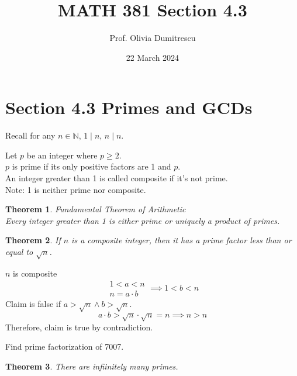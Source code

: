 \documentclass[letterpaper, 12pt]{article}
\title{MATH 381 Section 4.3}
\author{Prof. Olivia Dumitrescu}
\date{22 March 2024}
\newtheorem{theorem}{Theorem}[section]
\newenvironment{proof}[1][Proof]{\begin{trivlist}
\item[\hskip \labelsep {\bfseries #1}]}{\end{trivlist}}
\newenvironment{definition}[1][Definition]{\begin{trivlist}
\item[\hskip \labelsep {\bfseries #1}]}{\end{trivlist}}
\newenvironment{example}[1][Example]{\begin{trivlist}
\item[\hskip \labelsep {\bfseries #1}]}{\end{trivlist}}
\newcommand{\N}{\mathbb{N}}
\newcommand{\0}{\emptyset}
\begin{document}
    \maketitle
    \section*{Section 4.3 Primes and GCDs}
    Recall for any $n \in \N$, $1 \mid n$, $n \mid n$.
    \begin{definition}
        Let $p$ be an integer where $p \ge 2$. \\
        $p$ is prime if its only positive factors are 1 and $p$. \\
        An integer greater than 1 is called composite if it's not prime. \\
        Note: 1 is neither prime nor composite.
    \end{definition}
    \begin{theorem}
        Fundamental Theorem of Arithmetic \\
        Every integer greater than 1 is either prime or uniquely a product of primes.
    \end{theorem}
    \begin{theorem}
        If $n$ is a composite integer, then it has a prime factor less than or equal to $\sqrt{n}$.
    \end{theorem}
    \begin{proof}
        $n$ is composite
        \[
            \begin{aligned}
                1 < a < n \\
                n = a \cdot b
            \end{aligned}
            \implies 1 < b < n
        \]
        Claim is false if $a > \sqrt{n} \wedge b > \sqrt{n}$.
        \[a \cdot b > \sqrt{n} \cdot \sqrt{n} = n \implies n > n\]
        Therefore, claim is true by contradiction.
    \end{proof}
    \begin{example}
        Find prime factorization of 7007.
    \end{example}
    \begin{theorem}
        There are infiinitely many primes.
    \end{theorem}
\end{document}
